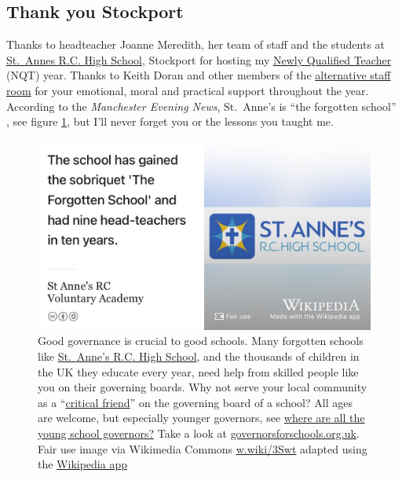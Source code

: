 \documentclass[
]{book}
\begin{document}
\hypertarget{stockport}{%
\subsection{Thank you Stockport}\label{stockport}}

Thanks to headteacher Joanne Meredith, her team of staff and the students at \href{https://en.wikipedia.org/wiki/St_Anne\%27s_RC_Voluntary_Academy}{St.~Annes R.C. High School}, Stockport for hosting my \href{https://en.wikipedia.org/wiki/Newly_qualified_teacher}{Newly Qualified Teacher} (NQT) year. Thanks to Keith Doran and other members of the \href{https://www.elizabethanstockport.co.uk/}{alternative staff room} for your emotional, moral and practical support throughout the year. According to the \emph{Manchester Evening News}, St.~Anne's is ``the forgotten school'' \citep{stannes1, stannes2}, see figure \ref{fig:st-annes-fig}, but I'll never forget you or the lessons you taught me.

\begin{figure}

{\centering \includegraphics[width=1\linewidth]{images/st-annes-rc-high-school} 

}

\caption{Good governance is crucial to good schools. Many forgotten schools like \href{https://en.wikipedia.org/wiki/St_Anne\%27s_RC_Voluntary_Academy}{St.~Anne's R.C. High School}, and the thousands of children in the UK they educate every year, need help from skilled people like you on their governing boards. Why not serve your local community as a ``\href{https://en.wikipedia.org/wiki/Critical_friend}{critical friend}'' on the governing board of a school? All ages are welcome, but especially younger governors, see \href{https://www.theguardian.com/teacher-network/2015/mar/11/young-people-school-governors}{where are all the young school governors?} \citep{youngovernors} Take a look at \href{https://governorsforschools.org.uk/}{governorsforschools.org.uk}. Fair use image via Wikimedia Commons \href{https://w.wiki/3Swt}{w.wiki/3Swt} adapted using the \href{https://apps.apple.com/us/app/wikipedia/id324715238}{Wikipedia app}}\label{fig:st-annes-fig}
\end{figure}
\end{document}
